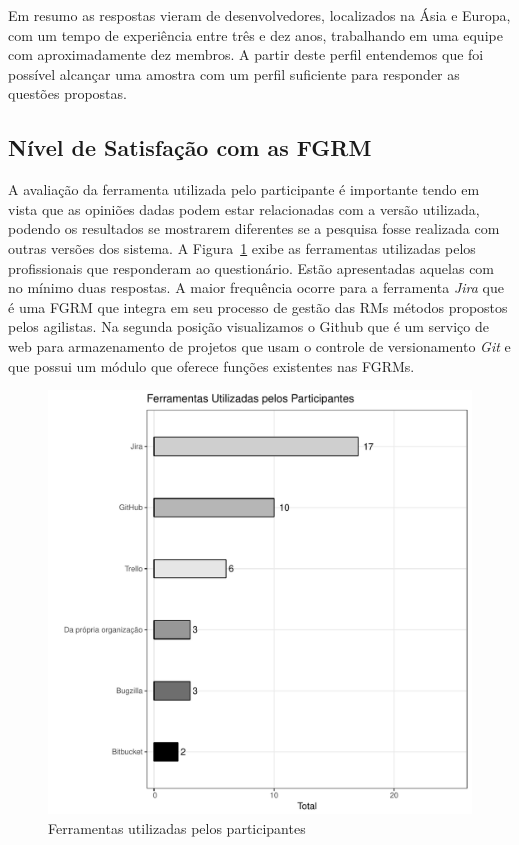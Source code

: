 
Em resumo as respostas vieram de desenvolvedores, localizados na Ásia e Europa,
com um tempo de experiência entre três e dez anos, trabalhando em uma equipe com
aproximadamente dez membros. A partir deste perfil entendemos que foi possível
alcançar uma amostra com um perfil suficiente para responder as questões
propostas.

\subsection{Nível de Satisfação com as FGRM}
\label{sub:nivel_de_satisfação_com_as_fgrm}

A avaliação da ferramenta utilizada pelo participante é importante tendo em
vista que as opiniões dadas podem estar relacionadas com a versão utilizada,
podendo os resultados se mostrarem diferentes se a pesquisa fosse realizada com
outras versões dos sistema. A
Figura~\ref{fig:grafico_melhorias_fgrm_ferramentas_utilizadas} exibe as
ferramentas utilizadas pelos profissionais que responderam ao questionário.
Estão apresentadas aquelas com no mínimo duas respostas. A maior frequência
ocorre para a ferramenta \textit{Jira} que é uma FGRM que integra em seu
processo de gestão das RMs métodos propostos pelos agilistas. Na segunda posição
visualizamos o Github que é um serviço de web para armazenamento de projetos que
usam o controle de versionamento \textit{Git} e que possui um módulo que oferece
funções existentes nas FGRMs.

\begin{figure}[htpb]
	\centering
	\includegraphics[width=0.6\linewidth]{./chapter-pesquisa-com-profissionais/img/grafico_melhorias_fgrm_ferramentas_utilizadas.pdf}
	\caption{Ferramentas utilizadas pelos participantes}
\label{fig:grafico_melhorias_fgrm_ferramentas_utilizadas}
\end{figure}

